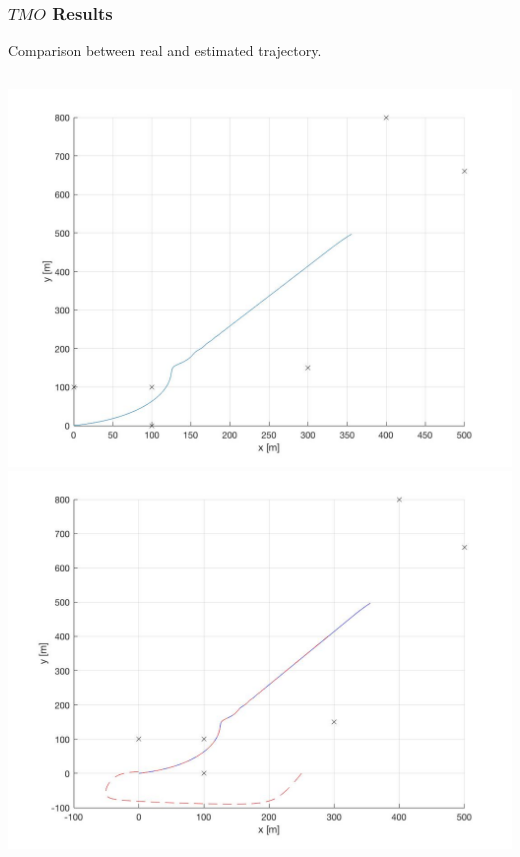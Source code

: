 \documentclass{beamer}
\begin{document}
	\begin{frame}
		\frametitle{$TMO$ Results}
		Comparison between real and estimated trajectory.
		\\
		\begin{columns}
			\includegraphics[scale=0.15]{true_traj.jpg}
			\includegraphics[scale=0.15]{comp_traj.jpg}
		\end{columns}
	\end{frame}
	
		
\end{document}
